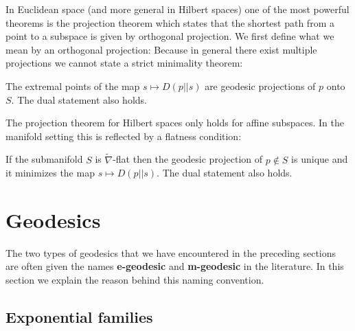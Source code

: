     In Euclidean space (and more general in Hilbert spaces) one of the most powerful theorems is the projection theorem which states that the shortest path from a point to a subspace is given by orthogonal projection. We first define what we mean by an orthogonal projection:
    Because in general there exist multiple projections we cannot state a strict minimality theorem:
    \begin{theorem}
        The extremal points of the map $s\mapsto D(p||s)$ are geodesic projections of $p$ onto $S$. The dual statement also holds.
    \end{theorem}
    The projection theorem for Hilbert spaces only holds for affine subspaces. In the manifold setting this is reflected by a flatness condition:
    \begin{property}
        If the submanifold $S$ is $\widetilde{\nabla}$-flat then the geodesic projection of $p\not\in S$ is unique and it minimizes the map $s\mapsto D(p||s)$. The dual statement also holds.
    \end{property}

\section{Geodesics}

    The two types of geodesics that we have encountered in the preceding sections are often given the names \textbf{e-geodesic} and \textbf{m-geodesic} in the literature. In this section we explain the reason behind this naming convention.

\subsection{Exponential families}

